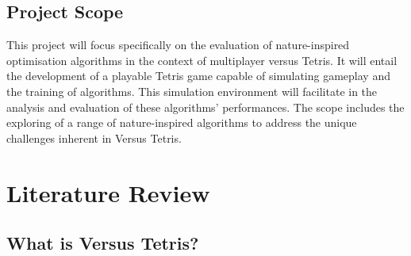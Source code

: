 \documentclass[a4paper, 12pt]{extreport}
\begin{document}
		\section{Project Scope}
			
			
			This project will focus specifically on the evaluation of nature-inspired optimisation algorithms in the context of multiplayer versus Tetris. It will entail the development of a playable Tetris game capable of simulating gameplay and the training of algorithms. This simulation environment will facilitate in the analysis and evaluation of these algorithms' performances. The scope includes the exploring of a range of nature-inspired algorithms to address the unique challenges inherent in Versus Tetris.
			
		
	
	\chapter{Literature Review}
		
		
		
		\section{What is Versus Tetris?}
	
\end{document}
